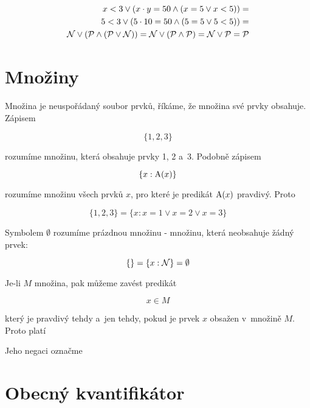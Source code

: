 \begin{equation}
\begin{split}
x < 3 \lor (x \cdot y = 50 \land (x = 5 \lor x < 5)) = \\
5 < 3 \lor (5 \cdot 10 = 50 \land (5 = 5 \lor 5 < 5)) = \\
\mathcal{N} \lor (\mathcal{P} \land (\mathcal{P} \lor \mathcal{N})) = \mathcal{N} \lor (\mathcal{P} \land \mathcal{P}) = \mathcal{N} \lor \mathcal{P} = \mathcal{P} 
\end{split}
\end{equation}

\section{Množiny}

Množina je neuspořádaný soubor prvků, říkáme, že množina své prvky obsahuje. Zápisem

\begin{equation}
\{1, 2, 3\}
\end{equation}

rozumíme množinu, která obsahuje prvky 1, 2 a~3. Podobně zápisem

\begin{equation}
\{x: \mathrm{A}(x)\}
\end{equation}

rozumíme množinu všech prvků \(x\), pro které je predikát \(\mathrm{A}(x)\) pravdivý. Proto

\begin{equation}
\{1, 2, 3\} = \{x: x = 1 \lor x = 2 \lor x = 3\}
\end{equation}

Symbolem \(\emptyset\) rozumíme prázdnou množinu - množinu, která neobsahuje žádný prvek:

\begin{equation}
\{\} = \{x: \mathcal{N}\} = \emptyset
\end{equation}

Je-li \(M\) množina, pak můžeme zavést predikát

\begin{equation}
x \in M
\end{equation}

který je pravdivý tehdy a~jen tehdy, pokud je prvek \(x\) obsažen v~množině \(M\). Proto platí


Jeho negaci označme


\section{Obecný kvantifikátor}


